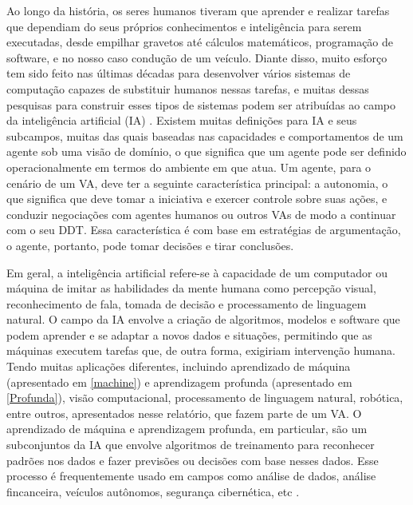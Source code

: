 Ao longo da história, os seres humanos tiveram que aprender e realizar tarefas que dependiam do seus próprios conhecimentos e inteligência para serem executadas, desde empilhar gravetos até cálculos matemáticos, programação de software, e no nosso caso condução de um veículo. Diante disso, muito esforço tem sido feito nas últimas décadas para desenvolver vários sistemas de computação capazes de substituir humanos nessas tarefas, e muitas dessas pesquisas para construir esses tipos de sistemas podem ser atribuídas ao campo da inteligência artificial (IA) \cite{caio}. 
Existem muitas definições para IA e seus subcampos, muitas das quais baseadas nas capacidades e comportamentos de um agente sob uma visão de domínio, o que significa que um agente pode ser definido operacionalmente em termos do ambiente em que atua.
Um agente, para o cenário de um VA, deve ter a seguinte característica principal: a autonomia, o que significa que deve tomar a iniciativa e exercer controle sobre suas ações, e conduzir negociações com agentes humanos ou outros VAs de modo a continuar com o seu DDT.
Essa característica é com base em estratégias de argumentação, o agente, portanto, pode tomar decisões e tirar conclusões. 

Em geral, a inteligência artificial refere-se à capacidade de um computador ou máquina de imitar as habilidades da mente humana \cite{software-ia} como percepção visual, reconhecimento de fala, tomada de decisão e processamento de linguagem natural. O campo da IA envolve a criação de algoritmos, modelos e software que podem aprender e se adaptar a novos dados e situações, permitindo que as máquinas executem tarefas que, de outra forma, exigiriam intervenção humana. Tendo muitas aplicações diferentes, incluindo aprendizado de máquina (apresentado em \ref{machine}) e aprendizagem profunda (apresentado em \ref{Profunda}), visão computacional, processamento de linguagem natural, robótica, entre outros, apresentados nesse relatório, que fazem parte de um VA. O aprendizado de máquina e aprendizagem profunda, em particular, são um subconjuntos da IA que envolve algoritmos de treinamento para reconhecer padrões nos dados e fazer previsões ou decisões com base nesses dados. Esse processo é frequentemente usado em campos como análise de dados, análise fincanceira, veículos autônomos, segurança cibernética, etc \cite{software-review, software-cnn}.


 \label{machine}

